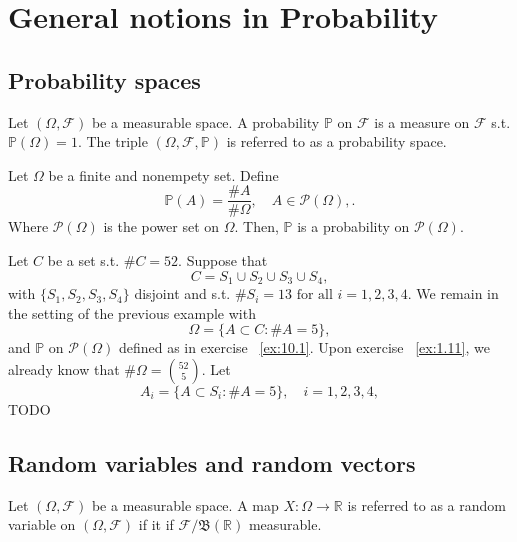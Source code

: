 \chapter{General notions in Probability}%
\label{cha:General notions in Probability}

\section{Probability spaces}%
\label{sec:Probability spaces}

\begin{definition}[]
    \label{def:10.1}
    Let $(\Omega, \mathcal{F})$ be a measurable space. A probability $\mathbb{P}$ on
    $\mathcal{F}$ is a measure on $\mathcal{F}$ s.t. $\mathbb{P}(\Omega) = 1$.
    The triple $(\Omega, \mathcal{F}, \mathbb{P})$ is referred to as a probability space.
\end{definition}

\begin{example}[]
    \label{ex:10.1}
    Let $\Omega$ be a finite and nonempety set. Define
    \[
    \mathbb{P}(A) = \frac{\#A}{\#\Omega}, \quad A \in \mathcal{P}(\Omega),
    .\] 
    Where $\mathcal{P}(\Omega)$ is the power set on $\Omega$. Then, $\mathbb{P}$ is a 
    probability on $\mathcal{P}(\Omega)$.
\end{example}

\begin{example}[]
    \label{ex:10.2}
    Let $C$ be a set s.t. $\#C = 52$. Suppose that
    \[
    C = S_1 \cup S_2 \cup  S_3 \cup S_4
    ,\] 
    with $\{S_1, S_2, S_3, S_4\} $ disjoint and s.t. $\#S_i = 13 \text{ for all } 
    i = 1,2,3,4$. We remain in the setting of the previous example with
    \[
    \Omega = \{A \subset C: \#A = 5\},
    \] 
    and $\mathbb{P}$ on $\mathcal{P}(\Omega)$ defined as in exercise ~\ref{ex:10.1}.
    Upon exercise ~\ref{ex:1.11}, we already know that $\#\Omega = \binom{52}{5}$.
    Let
    \[
    A_i = \{A \subset S_i: \#A = 5\}, \quad i=1,2,3,4, 
    \] 
    TODO
\end{example}

\section{Random variables and random vectors}%
\label{sec:Random variables and random vectors}

\begin{definition}
    \label{def:10.2}
    Let $(\Omega, \mathcal{F})$ be a measurable space. A map $X: \Omega \to \mathbb{R}$
    is referred to as a random variable on $(\Omega, \mathcal{F})$ if it if 
    $\mathcal{F}/ \mathfrak{B}(\mathbb{R})$ measurable.
\end{definition}


